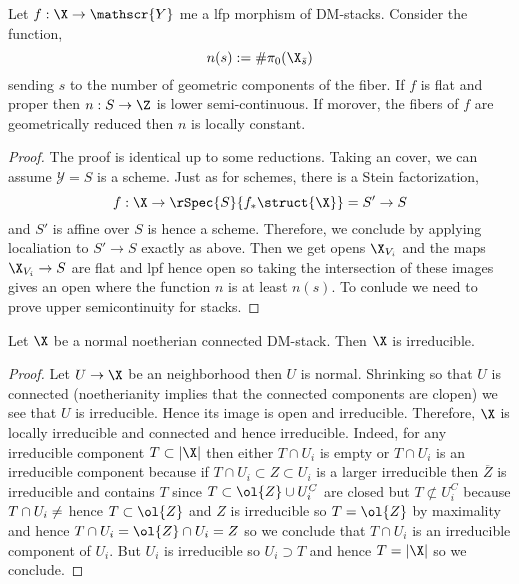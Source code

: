 \documentclass[12pt]{article}
\begin{document}
\newcommand{\Y}{\mathscr{Y}}

\begin{theorem}
Let $f : \X \to \Y$ me a lfp morphism of DM-stacks. Consider the function,
\[ n(s) := \# \pi_0(\X_{\bar{s}}) \]
sending $s$ to the number of geometric components of the fiber. If $f$ is flat and proper then $n : S \to \Z$ is lower semi-continuous. If morover, the fibers of $f$ are geometrically reduced then $n$ is locally constant.
\end{theorem}

\begin{proof}
The proof is identical up to some reductions. Taking an \etale cover, we can assume $\Y = S$ is a scheme. Just as for schemes, there is a Stein factorization,
\[ f : \X \to \rSpec{S}{f_* \struct{\X}} = S' \to S \]
and $S'$ is affine over $S$ is hence a scheme. Therefore, we conclude by applying \etale localiation to $S' \to S$ exactly as above. Then we get opens $\X_{V_i}$ and the maps $\X_{V_i} \to S$ are flat and lpf hence open so taking the intersection of these images gives an open where the function $n$ is at least $n(s)$. To conlude we need to prove upper semicontinuity for stacks. 
\end{proof}

\begin{prop}
Let $\X$ be a normal noetherian connected DM-stack. Then $\X$ is irreducible.
\end{prop}

\begin{proof}
Let $U \to \X$ be an \etale neighborhood then $U$ is normal. Shrinking so that $U$ is connected (noetherianity implies that the connected components are clopen) we see that $U$ is irreducible. Hence its image is open and irreducible. Therefore, $\X$ is locally irreducible and connected and hence irreducible. Indeed, for any irreducible component $T \subset |\X|$ then either $T \cap U_i$ is empty or $T \cap U_i$ is an irreducible component because if $T \cap U_i \subset Z \subset U_i$ is a larger irreducible then $\overline{Z}$ is irreducible and contains $T$ since $T \subset \ol{Z} \cup U_i^C$ are closed but $T \not\subset U_i^C$ because $T \cap U_i \neq \empty$ hence $T \subset \ol{Z}$ and $Z$ is irreducible so $T = \ol{Z}$ by maximality and hence $T \cap U_i = \ol{Z} \cap U_i = Z$ so we conclude that $T \cap U_i$ is an irreducible component of $U_i$. But $U_i$ is irreducible so $U_i \supset T$ and hence $T = |\X|$ so we conclude.  
\end{proof}
\end{document}
